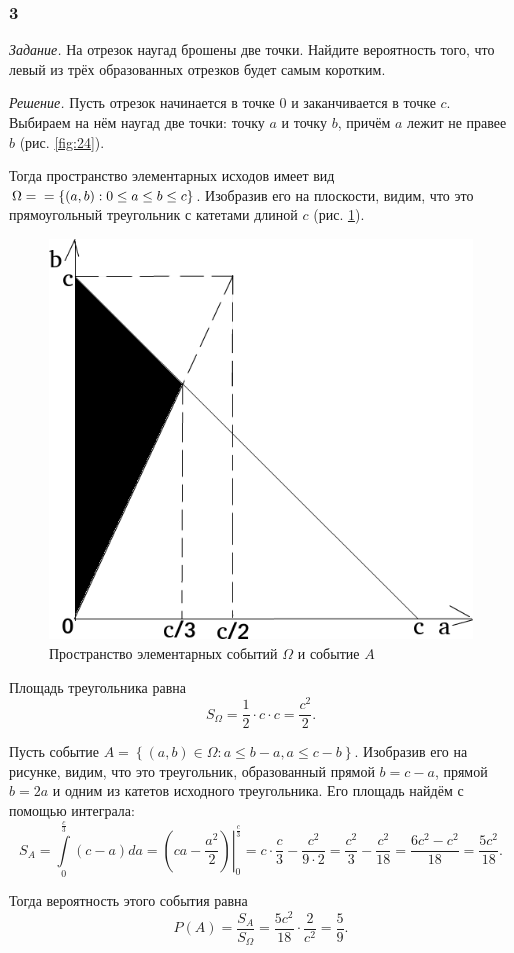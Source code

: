 \subsubsection*{3}

\textit{Задание.} На отрезок наугад брошены две точки.
Найдите вероятность того, что левый из трёх образованных отрезков будет самым коротким.

\textit{Решение.} Пусть отрезок начинается в точке 0 и заканчивается в точке $c$.
Выбираем на нём наугад две точки: точку $a$ и точку $b$, причём $a$ лежит не правее $b$ (рис. \ref{fig:24}).

Тогда пространство элементарных исходов имеет вид $ \Omega =  \\
= \left\{ \left( a, b \right): 0 \leq a \leq b \leq c \right\} $.
Изобразив его на плоскости, видим, что это прямоугольный треугольник с катетами длиной $c$ (рис. \ref{fig:33}).

\begin{figure}[h!]
  \centering
  \includegraphics[width=.4\textwidth]{./pictures/t1v3_3.png}
  \caption{Пространство элементарных событий $ \Omega$ и событие $A$}
  \label{fig:33}
\end{figure}

Площадь треугольника равна
$$S_{ \Omega } =
\frac{1}{2} \cdot c \cdot c =
\frac{c^2}{2}.$$

Пусть событие $A = \left\{ \left( a, b \right) \in \Omega: a \leq b-a, a \leq c-b \right\} $.
Изобразив его на рисунке, видим, что это треугольник, образованный прямой $b = c - a$, прямой $b = 2a$ и одним из катетов исходного треугольника.
Его площадь найдём с помощью интеграла:
$$S_A =
\int \limits_0^{ \frac{c}{3} } \left( c - a \right) da =
\left. \left( ca - \frac{a^2}{2} \right) \right|_0^{ \frac{c}{3} } =
c \cdot \frac{c}{3} - \frac{c^2}{9 \cdot 2} =
\frac{c^2}{3} - \frac{c^2}{18} =
\frac{6c^2 - c^2}{18} =
\frac{5c^2}{18}.$$

Тогда вероятность этого события равна
$$P \left( A \right) =
\frac{S_A}{S_{ \Omega }} =
\frac{5c^2}{18} \cdot \frac{2}{c^2} =
\frac{5}{9}.$$

